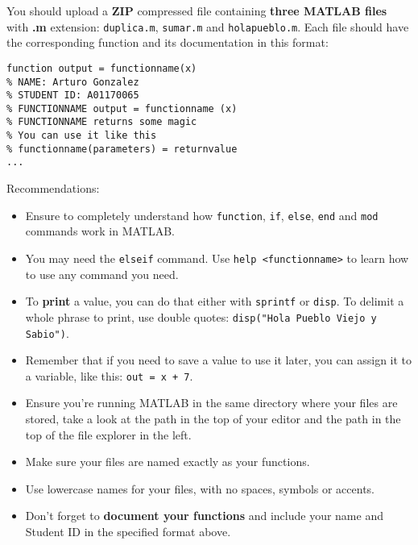 \documentclass[]{book}
\newcommand{\matlab}[1]{\lstinline[style=Matlab-pyglike]!#1!}
\theoremstyle{definition}
\begin{document}
\bigskip

You should upload a \textbf{ZIP} compressed file containing \textbf{three MATLAB files} with \textbf{.m} extension:
\texttt{duplica.m}, \texttt{sumar.m} and \texttt{holapueblo.m}.
Each file should have the corresponding function and its documentation in this format:

\bigskip

\begin{lstlisting}[style=Matlab-editor]
function output = functionname(x)
% NAME: Arturo Gonzalez
% STUDENT ID: A01170065
% FUNCTIONNAME output = functionname (x)
% FUNCTIONNAME returns some magic
% You can use it like this
% functionname(parameters) = returnvalue
...
\end{lstlisting}

\pagebreak

{\Large Recommendations:}
\begin{itemize}
    \item Ensure to completely understand how \matlab{function}, \matlab{if}, \matlab{else}, \matlab{end} and \matlab{mod} commands work in MATLAB.
    \item You may need the \matlab{elseif} command. Use \matlab{help <functionname>} to learn how to use any command you need.
    \item To \textbf{print} a value, you can do that either with \matlab{sprintf} or \matlab{disp}. To delimit a whole phrase to print, use double quotes: \matlab{disp("Hola Pueblo Viejo y Sabio")}.
    \item Remember that if you need to save a value to use it later, you can assign it to a variable, like this: \matlab{out = x + 7}.
    \item Ensure you're running MATLAB in the same directory where your files are stored, take a look at the path in the top of your editor and the path in the top of the file explorer in the left.
    \item Make sure your files are named exactly as your functions.
    \item Use lowercase names for your files, with no spaces, symbols or accents.
    \item Don't forget to \textbf{document your functions} and include your name and Student ID in the specified format above.
\end{itemize}
\end{document}
